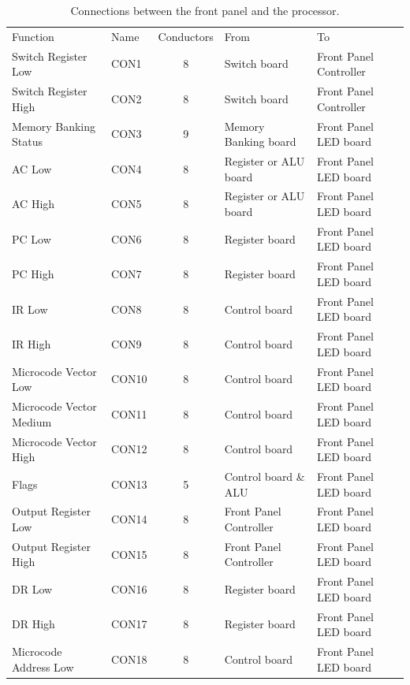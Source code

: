 \documentclass[11pt,a4paper,twocolumns]{article}
\newcommand\zebra{\rowcolors{2}{gray!10}{white}}
\newcommand\register[1]{\textsf{#1}}
\newcommand\A{\register{AC}}
\newcommand\DR{\register{DR}}
\newcommand\PC{\register{PC}}
\newcommand\IR{\register{IR}}
\begin{document}
\begin{table}[tb]
  \caption{\label{tab-connectors}Connections between the front panel
    and the processor.}
  \centering
  \zebra
  \begin{tabular}{llcll}
    \noalign{\smallskip}\hline\noalign{\smallskip}
    Function & Name & Conductors & From & To \\
    \noalign{\smallskip}\hline\noalign{\smallskip}
    Switch Register Low      & CON1  & 8 & Switch board & Front Panel Controller \\
    Switch Register High     & CON2  & 8 & Switch board & Front Panel Controller \\
    Memory Banking Status    & CON3  & 9 & Memory Banking board & Front Panel LED board \\
    \A{} Low                 & CON4  & 8 & Register or ALU board & Front Panel LED board \\
    \A{} High                & CON5  & 8 & Register or ALU board & Front Panel LED board \\
    \PC{} Low                & CON6  & 8 & Register board & Front Panel LED board \\
    \PC{} High               & CON7  & 8 & Register board & Front Panel LED board \\
    \IR{} Low                & CON8  & 8 & Control board & Front Panel LED board \\
    \IR{} High               & CON9  & 8 & Control board & Front Panel LED board \\
    Microcode Vector Low     & CON10 & 8 & Control board & Front Panel LED board \\
    Microcode Vector Medium  & CON11 & 8 & Control board & Front Panel LED board \\
    Microcode Vector High    & CON12 & 8 & Control board & Front Panel LED board \\
    Flags                    & CON13 & 5 & Control board \& ALU & Front Panel LED board \\
    Output Register Low      & CON14 & 8 & Front Panel Controller & Front Panel LED board \\
    Output Register High     & CON15 & 8 & Front Panel Controller & Front Panel LED board \\
    \DR{} Low                & CON16 & 8 & Register board & Front Panel LED board \\
    \DR{} High               & CON17 & 8 & Register board & Front Panel LED board \\
    Microcode Address Low    & CON18 & 8 & Control board & Front Panel LED board \\

\end{tabular}
\end{table}
\end{document}
